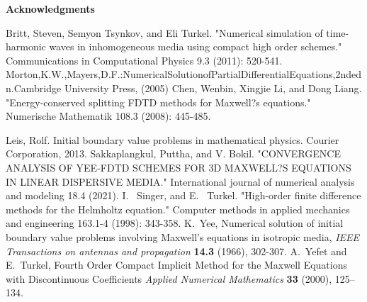 \documentclass[12pt,reqno]{amsart}
\theoremstyle{definition}
\numberwithin{equation}{section}
\begin{document}
			
			\begin{center}
				{\bf Acknowledgments}
			\end{center}
			\begin{thebibliography}{99}
				
				
				Britt, Steven, Semyon Tsynkov, and Eli Turkel. "Numerical simulation of time-harmonic waves in inhomogeneous media using compact high order schemes." Communications in Computational Physics 9.3 (2011): 520-541.					
				Morton,K.W.,Mayers,D.F.:NumericalSolutionofPartialDifferentialEquations,2ndedn.Cambridge
				University Press, (2005)
				Chen, Wenbin, Xingjie Li, and Dong Liang. "Energy-conserved splitting FDTD methods for Maxwell?s equations." Numerische Mathematik 108.3 (2008): 445-485.
				
				Leis, Rolf. Initial boundary value problems in mathematical physics. Courier Corporation, 2013.
				Sakkaplangkul, Puttha, and V. Bokil. "CONVERGENCE ANALYSIS OF YEE-FDTD SCHEMES FOR 3D MAXWELL?S EQUATIONS IN LINEAR DISPERSIVE MEDIA." International journal of numerical analysis and modeling 18.4 (2021).	
				I. ~Singer, and E.~ Turkel. "High-order finite difference methods for the Helmholtz equation." Computer methods in applied mechanics and engineering 163.1-4 (1998): 343-358.					
				K.~Yee, Numerical solution of initial boundary value problems involving Maxwell's equations in isotropic media, {\em IEEE Transactions on antennas and propagation} {\bf 14.3} (1966), 302-307.
				A.~Yefet and E.~Turkel,
				Fourth Order Compact Implicit Method for the Maxwell Equations with Discontinuous Coefficients
				{\em Applied Numerical Mathematics}  {\bf 33} (2000), 125--134.
			\end{thebibliography}
		
\end{document}
